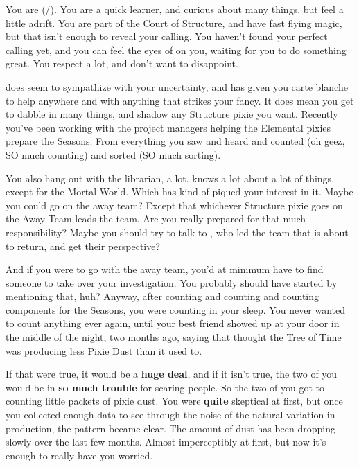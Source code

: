 \documentclass[char]{PP}
\begin{document}
\name{\cSHelp{}}

You are \cSHelp{} (\cSHelp{\They}/\cSHelp{\Them}). You are a quick learner, and curious about many things, but feel a little adrift. You are part of the Court of Structure, and have fast flying magic, but that isn’t enough to reveal your calling. You haven’t found your perfect calling yet, and you can feel the eyes of \cSHead{} on you, waiting for you to do something great. You respect \cSHead{\them} a lot, and don’t want to disappoint.

\cSHead{} does seem to sympathize with your uncertainty, and has given you carte blanche to help anywhere and with anything that strikes your fancy. It does mean you get to dabble in many things, and shadow any Structure pixie you want. Recently you’ve been working with the project managers helping the Elemental pixies prepare the Seasons. From everything you saw and heard and counted (oh geez, SO much counting) and sorted (SO much sorting).

You also hang out with the librarian, \cSLibrarian{} a lot. \cSLibrarian{} knows a lot about a lot of things, except for the Mortal World. Which has kind of piqued your interest in it. Maybe you could go on the away team? Except that whichever Structure pixie goes on the Away Team leads the team. Are you really prepared for that much responsibility? Maybe you should try to talk to \cSPM{}, who led the team that is about to return, and get their perspective?

And if you were to go with the away team, you’d at minimum have to find someone to take over your investigation. You probably should have started by mentioning that, huh? Anyway, after counting and counting and counting components for the Seasons, you were counting in your sleep. You never wanted to count anything ever again, until your best friend \cMTree{} showed up at your door in the middle of the night, two months ago, saying that \cMTree{\they} thought the Tree of Time was producing less Pixie Dust than it used to. 

If that were true, it would be a \textbf{huge deal}, and if it isn’t true, the two of you would be in \textbf{so much trouble} for scaring people. So the two of you got to counting little packets of pixie dust. You were \textbf{quite} skeptical at first, but once you collected enough data to see through the noise of the natural variation in production, the pattern became clear. The amount of dust has been dropping slowly over the last few months. Almost imperceptibly at first, but now it’s enough to really have you worried.
\end{document}
